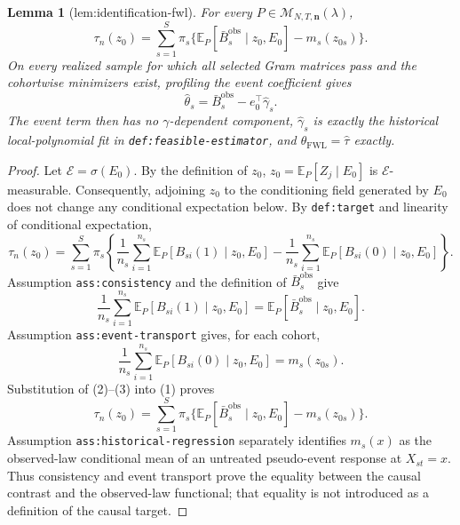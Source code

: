 \documentclass{article}
\newtheorem{lemma}{Lemma}
\begin{document}
\begin{lemma}[lem:identification-fwl]\label{lem:identification-fwl}
For every \(P\in\mathcal M_{N,T,\mathbf n}(\lambda)\),
\[
\tau_n(z_0)=\sum_{s=1}^{S}\pi_s
\{\mathbb E_P[\bar B_s^{\mathrm{obs}}\mid z_0,E_0]-m_s(z_{0s})\}.
\]
On every realized sample for which all selected Gram matrices pass and the cohortwise minimizers exist, profiling the event coefficient gives
\[
\widehat\theta_s=\bar B_s^{\mathrm{obs}}-e_0^\top\widehat\gamma_s.
\]
The event term then has no \(\gamma\)-dependent component, \(\widehat\gamma_s\) is exactly the historical local-polynomial fit in \texttt{def:feasible-estimator}, and \(\theta_{\mathrm{FWL}}=\widehat\tau\) exactly.
\end{lemma}
\begin{proof}
Let \(\mathscr E=\sigma(E_0)\).  By the definition of \(z_0\),
\(z_0=\mathbb E_P[Z_j\mid E_0]\) is \(\mathscr E\)-measurable.  Consequently,
adjoining \(z_0\) to the conditioning field generated by \(E_0\) does not
change any conditional expectation below.  By \texttt{def:target} and
linearity of conditional expectation,
\[
\tau_n(z_0)=\sum_{s=1}^{S}\pi_s\left\{
\frac1{n_s}\sum_{i=1}^{n_s}\mathbb E_P[B_{si}(1)\mid z_0,E_0]
-\frac1{n_s}\sum_{i=1}^{n_s}\mathbb E_P[B_{si}(0)\mid z_0,E_0]
\right\}.
\tag{1}
\]
Assumption \texttt{ass:consistency} and the definition of
\(\bar B_s^{\mathrm{obs}}\) give
\[
\frac1{n_s}\sum_{i=1}^{n_s}\mathbb E_P[B_{si}(1)\mid z_0,E_0]
=\mathbb E_P[\bar B_s^{\mathrm{obs}}\mid z_0,E_0].
\tag{2}
\]
Assumption \texttt{ass:event-transport} gives, for each cohort,
\[
\frac1{n_s}\sum_{i=1}^{n_s}\mathbb E_P[B_{si}(0)\mid z_0,E_0]
=m_s(z_{0s}).
\tag{3}
\]
Substitution of (2)--(3) into (1) proves
\[
\tau_n(z_0)=\sum_{s=1}^{S}\pi_s
\{\mathbb E_P[\bar B_s^{\mathrm{obs}}\mid z_0,E_0]-m_s(z_{0s})\}.
\]
Assumption \texttt{ass:historical-regression} separately identifies
\(m_s(x)\) as the observed-law conditional mean of an untreated
pseudo-event response at \(X_{st}=x\).  Thus consistency and event transport
prove the equality between the causal contrast and the observed-law
functional; that equality is not introduced as a definition of the causal
target.


\end{proof}
\end{document}

